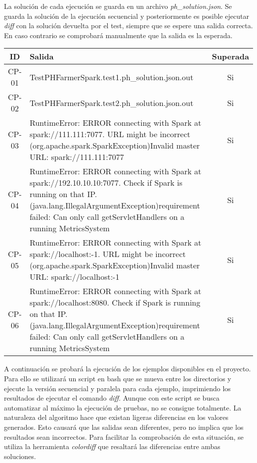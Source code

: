 La solución de cada ejecución se guarda en un archivo \textit{ph\_solution.json}. Se guarda la solución de la ejecución secuencial y posteriormente es posible ejecutar \textit{diff} con la solución devuelta por el test, siempre que se espere una salida correcta. En caso contrario se comprobará manualmente que la salida es la esperada.\\

\begin{tabularx}{\linewidth}{|c|X|c|}
    \hline
    \textbf{ID} & \centering \textbf{Salida} & \textbf{Superada} \tabularnewline
    \hline
    CP-01 & TestPHFarmerSpark.test1.ph\_solution.json.out & Si \tabularnewline
    \hline
    CP-02 & TestPHFarmerSpark.test2.ph\_solution.json.out & Si \tabularnewline
    \hline
    CP-03 & RuntimeError: ERROR connecting with Spark at spark://111.111:7077. URL might be incorrect (org.apache.spark.SparkException)Invalid master URL: spark://111.111:7077 & Si \tabularnewline
    \hline
    CP-04 & RuntimeError: ERROR connecting with Spark at spark://192.10.10.10:7077. Check if Spark is running on that IP. (java.lang.IllegalArgumentException)requirement failed: Can only call getServletHandlers on a running MetricsSystem & Si \tabularnewline
    \hline
    CP-05 & RuntimeError: ERROR connecting with Spark at spark://localhost:-1. URL might be incorrect (org.apache.spark.SparkException)Invalid master URL: spark://localhost:-1 & Si \tabularnewline
    \hline
    CP-06 & RuntimeError: ERROR connecting with Spark at spark://localhost:8080. Check if Spark is running on that IP. (java.lang.IllegalArgumentException)requirement failed: Can only call getServletHandlers on a running MetricsSystem & Si \tabularnewline
    \hline
\end{tabularx}

A continuación se probará la ejecución de los ejemplos disponibles en el proyecto. Para ello se utilizará un script en bash que se mueva entre los directorios y ejecute la versión secuencial y paralela para cada ejemplo, imprimiendo los resultados de ejecutar el comando \textit{diff}. Aunque con este script se busca automatizar al máximo la ejecución de pruebas, no se consigue totalmente. La naturaleza del algoritmo hace que existan ligeras diferencias en los valores generados. Esto causará que las salidas sean diferentes, pero no implica que los resultados sean incorrectos. 
Para facilitar la comprobación de esta situación, se utiliza la herramienta \textit{colordiff} que resaltará las diferencias entre ambas soluciones.\\

